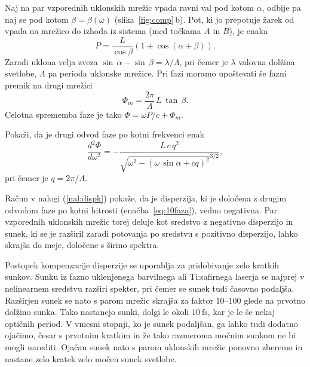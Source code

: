 Naj na par vzporednih uklonskih mrežic vpada ravni val pod kotom $\alpha$, odbije
pa naj se pod kotom $\beta = \beta(\omega)$ (slika~\ref{fig:comp}\,b). 
Pot, ki jo prepotuje žarek od vpada na mrežico 
do izhoda iz sistema (med točkama $A$ in $B$), je enaka 
\begin{equation}
P = \frac{L}{\cos\beta} \left(1+\cos(\alpha + \beta)\right).
\end{equation}
Zaradi uklona velja zveza $\sin\,\alpha - \sin\,\beta = \lambda/\Lambda$,
pri čemer je $\lambda$ valovna dolžina svetlobe, $\Lambda$ pa perioda uklonske mrežice. 
Pri fazi moramo upoštevati še fazni premik na drugi mrežici
\begin{equation}
\Phi_m=\frac{2\pi}{\Lambda} \, L \, \tan\,\beta.
\end{equation}
Celotna sprememba faze je tako $\Phi = \omega P/c + \Phi_m$.

\begin{definition}
\label{nal:dispk}
Pokaži, da je drugi odvod faze po kotni frekvenci enak
\begin{equation}
\frac{d^2 \Phi}{d \omega^2} = - \frac{L\, c\, q^2}
{\sqrt{\omega^2 - (\omega\, \sin\alpha + cq)^2}^{3/2}},
\label{eq:10faza}
\end{equation}
pri čemer je $q = 2 \pi/\Lambda$.
\end{definition}
Račun v nalogi (\ref{nal:dispk})
pokaže, da je disperzija, ki je določena z drugim odvodom faze po kotni hitrosti 
(enačba~\ref{eq:10faza}), vedno negativna. Par vzporednih uklonskih mrežic
torej deluje kot sredstvo
z negativno disperzijo in sunek, ki se je razširil zaradi potovanja
po sredstvu s pozitivno disperzijo, lahko skrajša do meje,
določene s širino spektra. 

\begin{remark}
Postopek kompenzacije disperzije se uporablja za pridobivanje zelo 
kratkih sunkov. Sunku iz fazno uklenjenega barvilnega 
ali Ti:safirnega
laserja se najprej v nelinearnem sredstvu razširi spekter, pri čemer
se sunek tudi časovno podaljša. Razširjen sunek se nato s parom mrežic skrajša
za faktor $10$--$100$ glede na prvotno dolžino sunka. Tako nastanejo sunki,
dolgi le okoli $10~\si{\femto\second}$, kar je le še nekaj optičnih period. 
V vmesni stopnji, ko je sunek podaljšan, ga lahko tudi dodatno ojačimo, česar
s prvotnim kratkim in že tako razmeroma močnim sunkom ne bi mogli narediti. Ojačan
sunek nato s parom uklonskih mrežic ponovno zberemo in nastane zelo kratek
zelo močen sunek svetlobe.
\end{remark}

